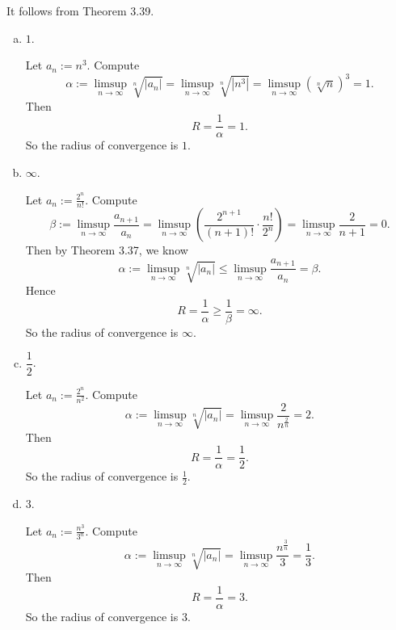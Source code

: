 \begin{Exercise}
	It follows from Theorem 3.39.
	\begin{enumerate}[(a)]
		\item
		\begin{answer}
			$1$.
		\end{answer}
		\begin{solution}
			Let $a_n := n^3$. Compute
			$$
			\alpha := \limsup_{n\to\infty} \sqrt[n]{|a_n|}
			= \limsup_{n\to\infty} \sqrt[n]{|n^3|}
			=\limsup_{n\to\infty} (\sqrt[n]{n})^3
			= 1.
			$$
			Then
			$$
			R = \frac{1}{\alpha}
			= 1.
			$$
			So the radius of convergence is $1$.
		\end{solution}
		
		\item
		\begin{answer}
			$\infty$.
		\end{answer}
		\begin{solution}
			Let $a_n := \frac{2^n}{n!}$.
			Compute
			$$
			\beta := \limsup_{n\to\infty}\frac{a_{n+1}}{a_n}
			= \limsup_{n\to\infty}\left( \frac{2^{n+1}}{(n+1)!} \cdot \frac{n!}{2^n} \right) 
			= \limsup_{n\to\infty} \frac{2}{n+1}
			= 0.
			$$
			Then by Theorem 3.37, we know
			$$
			\alpha := \limsup_{n\to\infty} \sqrt[n]{|a_n|} 
			\leq \limsup_{n\to\infty}\frac{a_{n+1}}{a_n} 
			= \beta.
			$$
			Hence
			$$
			R = \frac{1}{\alpha} \geq \frac{1}{\beta} = \infty.
			$$
			So the radius of convergence is $\infty$.
		\end{solution}
		
		\item
		\begin{answer}
			$\dfrac{1}{2}$.
		\end{answer}
		\begin{solution}
			Let $a_n := \frac{2^n}{n^2}$. 
			Compute
			$$
			\alpha := \limsup_{n\to\infty} \sqrt[n]{|a_n|} 
			= \limsup_{n\to\infty}\frac{2}{n^{\frac{2}{n}}}
			= 2.
			$$
			Then 
			$$
			R = \frac{1}{\alpha}
			= \frac{1}{2}.
			$$
			So the radius of convergence is $\frac{1}{2}$.
		\end{solution}
		
		\item
		\begin{answer}
			$3$.
		\end{answer}
		\begin{solution}
			Let $a_n := \frac{n^3}{3^n}$. 
			Compute
			$$
			\alpha := \limsup_{n\to\infty} \sqrt[n]{|a_n|} 
			= \limsup_{n\to\infty}\frac{n^{\frac{3}{n}}}{3}
			= \frac{1}{3}.
			$$
			Then
			$$
			R = \frac{1}{\alpha}
			= 3.
			$$
			So the radius of convergence is $3$.
		\end{solution}
	\end{enumerate}
\end{Exercise}